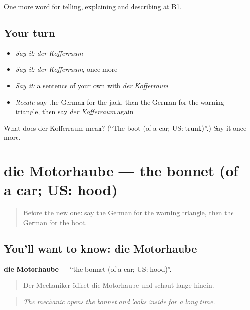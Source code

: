 \begin{grammarlens}[title={What you've built}]
One more word for telling, explaining and describing at B1.
\end{grammarlens}

\subsection*{Your turn}
\begin{itemize}
\raggedright
  \item \emph{Say it:} \emph{der Kofferraum}
  \item \emph{Say it:} \emph{der Kofferraum}, once more
  \item \emph{Say it:} a sentence of your own with \emph{der Kofferraum}
  \item \emph{Recall:} say the German for the jack, then the German for the warning triangle, then say \emph{der Kofferraum} again
\end{itemize}

\begin{tcolorbox}[breakable,colback=teal!4,colframe=teal!35!black,title={Before you move on}]
What does der Kofferraum mean? (\textquotedblleft{}The boot (of a car; US: trunk)\textquotedblright{}.) Say it once more.
\end{tcolorbox}
\section[die Motorhaube]{die Motorhaube — the bonnet (of a car; US: hood)}

\label{lesson:GE-C405-motorhaube}



\begin{quote}
Before the new one: say the German for the warning triangle, then the German for the boot.
\end{quote}

\subsection*{You'll want to know: die Motorhaube}
\textbf{die Motorhaube} — \textquotedblleft{}the bonnet (of a car; US: hood)\textquotedblright{}.

\begin{quote}
Der Mechaniker öffnet die Motorhaube und schaut lange hinein.
\end{quote}

\begin{quote}
\emph{The mechanic opens the bonnet and looks inside for a long time.}
\end{quote}

